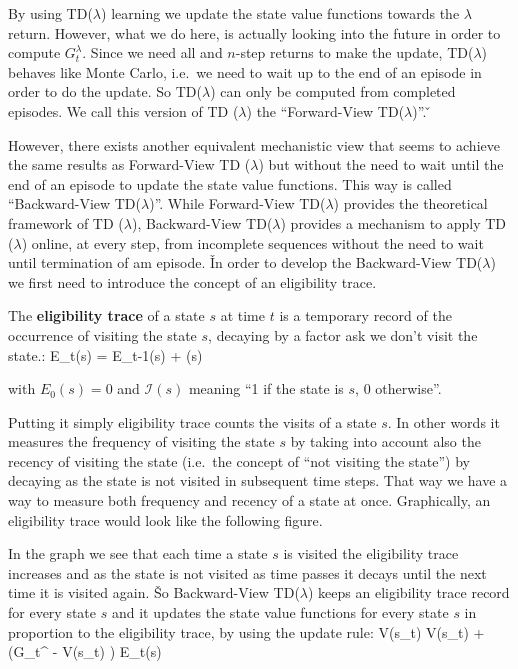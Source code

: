 By using TD($\lambda$) learning we update the state value functions towards the $\lambda$ return. However, what we do
here, is actually looking into the future in order to compute $G_t^\lambda$. Since we need all and $n$-step returns
to make the update, TD($\lambda$) behaves like Monte Carlo, i.e.\ we need to wait up to the end of an episode in order
to do the update. So TD($\lambda$) can only be computed from completed episodes. We call this version of TD
($\lambda$) the ``Forward-View TD($\lambda$)''. \v


However, there exists another equivalent mechanistic view that seems to achieve the same results as Forward-View TD
($\lambda$) but without the need to wait until the end of an episode to update the state value functions. This way is
called ``Backward-View TD($\lambda$)''. While Forward-View TD($\lambda$) provides the theoretical framework of TD
($\lambda$), Backward-View TD($\lambda$) provides a mechanism to apply TD ($\lambda$) online, at every step, from
incomplete sequences without the need to wait until termination of am episode. \v

In order to develop the Backward-View TD($\lambda$) we first need to introduce the concept of an eligibility trace.

The \textbf{eligibility trace} of a state $s$ at time $t$ is a temporary record of the occurrence of visiting the
state $s$, decaying by a factor ask we don't visit the state.:
\bse
E_t(s) = \gamma \lambda E_{t-1}(s) + (s)
\ese

with $E_0(s) = 0$ and $\mathcal{I}(s)$ meaning ``1 if the state is $s$, 0 otherwise''.
\ed

Putting it simply eligibility trace counts the visits of a state $s$. In other words it measures the frequency of
visiting the state $s$ by taking into account also the recency of visiting the state (i.e.\ the concept of ``not
visiting the state'') by decaying as the state is not visited in subsequent time steps. That way we have a way to
measure both frequency and recency of a state at once. Graphically, an eligibility trace would look like the
following figure.


In the graph we see that each time a state $s$ is visited the eligibility trace increases and as the state is not
visited as time passes it decays until the next time it is visited again. \v

So Backward-View TD($\lambda$) keeps an eligibility trace record for every state $s$ and it updates the state value
functions for every state $s$ in proportion to the eligibility trace, by using the update rule:
\bse
V(s_t) \gets V(s_t) + \alpha \left(G_t^{\lambda} - V(s_t) \right) E_t(s)
\ese

